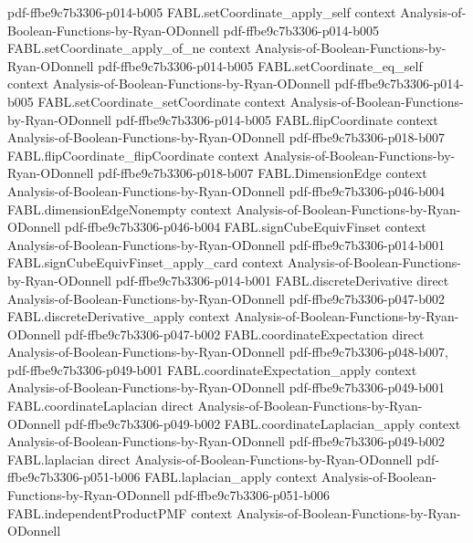 \begin{theorem}
  {pdf-ffbe9c7b3306-p014-b005}
\proofstep
  {FABL.setCoordinate_apply_self}
  {context}
  {Analysis-of-Boolean-Functions-by-Ryan-ODonnell}
  {pdf-ffbe9c7b3306-p014-b005}
\proofstep
  {FABL.setCoordinate_apply_of_ne}
  {context}
  {Analysis-of-Boolean-Functions-by-Ryan-ODonnell}
  {pdf-ffbe9c7b3306-p014-b005}
\proofstep
  {FABL.setCoordinate_eq_self}
  {context}
  {Analysis-of-Boolean-Functions-by-Ryan-ODonnell}
  {pdf-ffbe9c7b3306-p014-b005}
\proofstep
  {FABL.setCoordinate_setCoordinate}
  {context}
  {Analysis-of-Boolean-Functions-by-Ryan-ODonnell}
  {pdf-ffbe9c7b3306-p014-b005}
\proofstep
  {FABL.flipCoordinate}
  {context}
  {Analysis-of-Boolean-Functions-by-Ryan-ODonnell}
  {pdf-ffbe9c7b3306-p018-b007}
\proofstep
  {FABL.flipCoordinate_flipCoordinate}
  {context}
  {Analysis-of-Boolean-Functions-by-Ryan-ODonnell}
  {pdf-ffbe9c7b3306-p018-b007}
\proofstep
  {FABL.DimensionEdge}
  {context}
  {Analysis-of-Boolean-Functions-by-Ryan-ODonnell}
  {pdf-ffbe9c7b3306-p046-b004}
\proofstep
  {FABL.dimensionEdgeNonempty}
  {context}
  {Analysis-of-Boolean-Functions-by-Ryan-ODonnell}
  {pdf-ffbe9c7b3306-p046-b004}
\proofstep
  {FABL.signCubeEquivFinset}
  {context}
  {Analysis-of-Boolean-Functions-by-Ryan-ODonnell}
  {pdf-ffbe9c7b3306-p014-b001}
\proofstep
  {FABL.signCubeEquivFinset_apply_card}
  {context}
  {Analysis-of-Boolean-Functions-by-Ryan-ODonnell}
  {pdf-ffbe9c7b3306-p014-b001}
\proofstep
  {FABL.discreteDerivative}
  {direct}
  {Analysis-of-Boolean-Functions-by-Ryan-ODonnell}
  {pdf-ffbe9c7b3306-p047-b002}
\proofstep
  {FABL.discreteDerivative_apply}
  {context}
  {Analysis-of-Boolean-Functions-by-Ryan-ODonnell}
  {pdf-ffbe9c7b3306-p047-b002}
\proofstep
  {FABL.coordinateExpectation}
  {direct}
  {Analysis-of-Boolean-Functions-by-Ryan-ODonnell}
  {pdf-ffbe9c7b3306-p048-b007,
    pdf-ffbe9c7b3306-p049-b001}
\proofstep
  {FABL.coordinateExpectation_apply}
  {context}
  {Analysis-of-Boolean-Functions-by-Ryan-ODonnell}
  {pdf-ffbe9c7b3306-p049-b001}
\proofstep
  {FABL.coordinateLaplacian}
  {direct}
  {Analysis-of-Boolean-Functions-by-Ryan-ODonnell}
  {pdf-ffbe9c7b3306-p049-b002}
\proofstep
  {FABL.coordinateLaplacian_apply}
  {context}
  {Analysis-of-Boolean-Functions-by-Ryan-ODonnell}
  {pdf-ffbe9c7b3306-p049-b002}
\proofstep
  {FABL.laplacian}
  {direct}
  {Analysis-of-Boolean-Functions-by-Ryan-ODonnell}
  {pdf-ffbe9c7b3306-p051-b006}
\proofstep
  {FABL.laplacian_apply}
  {context}
  {Analysis-of-Boolean-Functions-by-Ryan-ODonnell}
  {pdf-ffbe9c7b3306-p051-b006}
\proofstep
  {FABL.independentProductPMF}
  {context}
  {Analysis-of-Boolean-Functions-by-Ryan-ODonnell}

\end{theorem}
